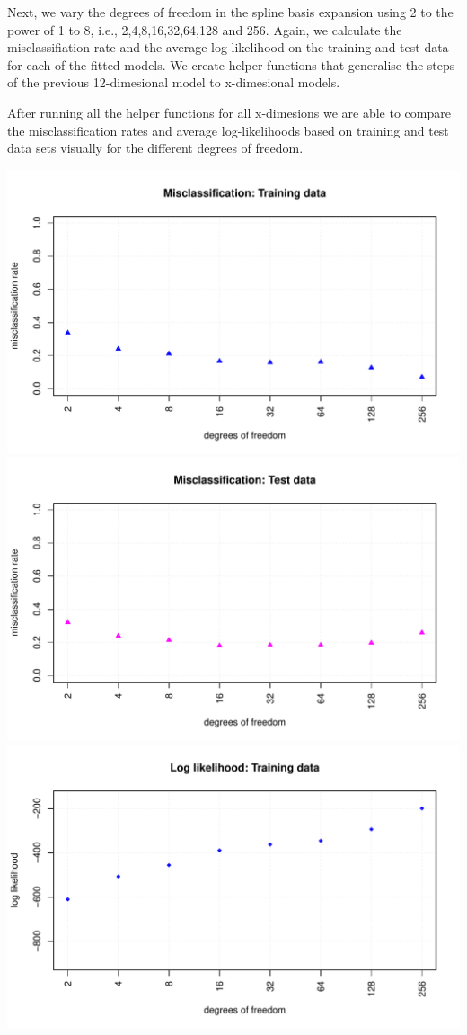\documentclass[
]{article}
\begin{document}
Next, we vary the degrees of freedom in the spline basis expansion using
2 to the power of 1 to 8, i.e., 2,4,8,16,32,64,128 and 256. Again, we
calculate the misclassifiation rate and the average log-likelihood on
the training and test data for each of the fitted models. We create
helper functions that generalise the steps of the previous 12-dimesional
model to x-dimesional models.

After running all the helper functions for all x-dimesions we are able
to compare the misclassification rates and average log-likelihoods based
on training and test data sets visually for the different degrees of
freedom.

\includegraphics{A2_files/figure-latex/unnamed-chunk-33-1.pdf}
\includegraphics{A2_files/figure-latex/unnamed-chunk-33-2.pdf}
\includegraphics{A2_files/figure-latex/unnamed-chunk-33-3.pdf}
\end{document}
